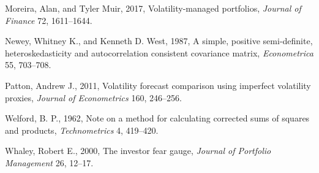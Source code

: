 \documentclass[10pt,twocolumn,letterpaper]{article}
\begin{document}
\begin{list}{}{\setlength{\leftmargin}{1.4em}\setlength{\itemindent}{-1.4em}\setlength{\itemsep}{1.5pt}\setlength{\parsep}{0pt}}
\item Moreira, Alan, and Tyler Muir, 2017, Volatility-managed portfolios, \textit{Journal of Finance} 72, 1611--1644.
\item Newey, Whitney K., and Kenneth D. West, 1987, A simple, positive semi-definite, heteroskedasticity and autocorrelation consistent covariance matrix, \textit{Econometrica} 55, 703--708.
\item Patton, Andrew J., 2011, Volatility forecast comparison using imperfect volatility proxies, \textit{Journal of Econometrics} 160, 246--256.
\item Welford, B. P., 1962, Note on a method for calculating corrected sums of squares and products, \textit{Technometrics} 4, 419--420.
\item Whaley, Robert E., 2000, The investor fear gauge, \textit{Journal of Portfolio Management} 26, 12--17.
\end{list}
\end{document}
